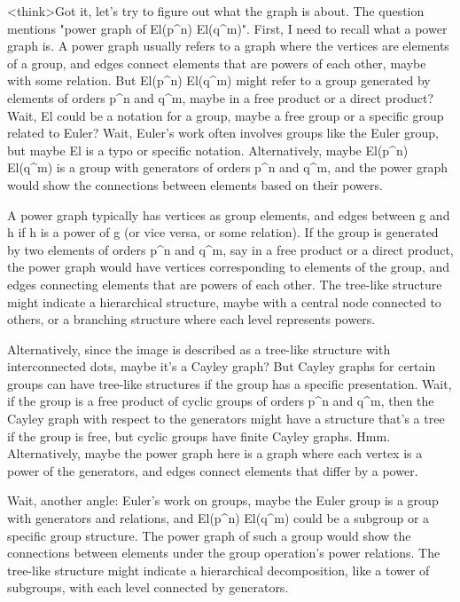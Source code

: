 <think>Got it, let's try to figure out what the graph is about. The question mentions "power graph of El(p^n) El(q^m)". First, I need to recall what a power graph is. A power graph usually refers to a graph where the vertices are elements of a group, and edges connect elements that are powers of each other, maybe with some relation. But El(p^n) El(q^m) might refer to a group generated by elements of orders p^n and q^m, maybe in a free product or a direct product? Wait, El could be a notation for a group, maybe a free group or a specific group related to Euler? Wait, Euler's work often involves groups like the Euler group, but maybe El is a typo or specific notation. Alternatively, maybe El(p^n) El(q^m) is a group with generators of orders p^n and q^m, and the power graph would show the connections between elements based on their powers. 

A power graph typically has vertices as group elements, and edges between g and h if h is a power of g (or vice versa, or some relation). If the group is generated by two elements of orders p^n and q^m, say in a free product or a direct product, the power graph would have vertices corresponding to elements of the group, and edges connecting elements that are powers of each other. The tree-like structure might indicate a hierarchical structure, maybe with a central node connected to others, or a branching structure where each level represents powers. 

Alternatively, since the image is described as a tree-like structure with interconnected dots, maybe it's a Cayley graph? But Cayley graphs for certain groups can have tree-like structures if the group has a specific presentation. Wait, if the group is a free product of cyclic groups of orders p^n and q^m, then the Cayley graph with respect to the generators might have a structure that's a tree if the group is free, but cyclic groups have finite Cayley graphs. Hmm. Alternatively, maybe the power graph here is a graph where each vertex is a power of the generators, and edges connect elements that differ by a power. 

Wait, another angle: Euler's work on groups, maybe the Euler group is a group with generators and relations, and El(p^n) El(q^m) could be a subgroup or a specific group structure. The power graph of such a group would show the connections between elements under the group operation's power relations. The tree-like structure might indicate a hierarchical decomposition, like a tower of subgroups, with each level connected by generators. 

